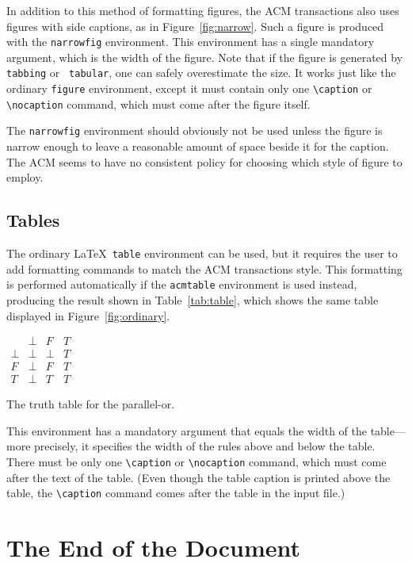 \documentclass[hyperref]{acmtrans2e}
\begin{document}
In addition to this method of formatting figures, the ACM transactions
also uses figures with side captions, as in Figure~\ref{fig:narrow}.
Such a figure is produced with the {\tt narrowfig} environment.  This
environment has a single mandatory argument, which is the width of the
figure.
Note that if the figure is generated by {\tt tabbing} or {\tt
tabular}, one can safely overestimate the size.
It works just like the ordinary {\tt figure} environment,
except it must contain only one \verb|\caption| or \verb|\nocaption|
command, which must come after the figure itself.  

The {\tt narrowfig} environment should obviously not be used unless the
figure is narrow enough to leave a reasonable amount of space beside it
for the caption.  The ACM seems to have no consistent policy for choosing
which style of figure to employ.

\subsection{Tables}

The ordinary \LaTeX\ {\tt table} environment can be used, but it
requires the user to add formatting commands to match the ACM
transactions style.  This formatting is performed automatically
if the {\tt acmtable} environment is used instead, producing
the result shown in Table~\ref{tab:table}, which shows the same
table displayed in Figure~\ref{fig:ordinary}.
\begin{acmtable}{100pt}
\centering
\(\begin{array}{c|ccc}
     & \bot & F & T \\
\hline
\bot & \bot & \bot & T \\
F    & \bot & F    & T \\
T    & \bot & T    & T
\end{array}\)
\caption{The truth table for the parallel-or.}
\label{tab:table}
\end{acmtable}
This environment has a mandatory argument that equals the width
of the table---more precisely, it specifies the width of the rules
above and below the table.  There must be only one 
\verb|\caption| or \verb|\nocaption|
command, which must come after the text of the table.  
(Even though the table caption is printed above the table, the
\verb|\caption| command comes after the table in the input file.)


\section{The End of the Document}
\end{document}
